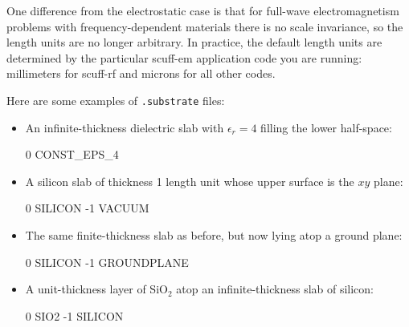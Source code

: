 \documentclass[letterpaper]{article}
\begin{document}
One difference from the electrostatic case is that for full-wave
electromagnetism problems with frequency-dependent materials
there is no scale invariance, so the length units are no longer
arbitrary. In practice, the default length units are determined
by the particular {\sc scuff-em} application code you are running:
millimeters for {\sc scuff-rf} and microns for all other codes.

Here are some examples of \texttt{.substrate} files:

\begin{itemize}

\item An infinite-thickness dielectric slab with $\epsilon_r=4$ filling
the lower half-space:

\medskip
\begin{verbcode}
0 CONST_EPS_4
\end{verbcode}
\medskip

\item A silicon slab of thickness 1 length unit whose upper surface is
the $xy$ plane:

\medskip
\begin{verbcode}
 0 SILICON
-1 VACUUM
\end{verbcode}

\item The same finite-thickness slab as before, but now 
lying atop a ground plane:

\medskip
\begin{verbcode}
 0 SILICON
-1 GROUNDPLANE
\end{verbcode}
\medskip

\item A unit-thickness layer of SiO$_2$ atop an infinite-thickness
slab of silicon:

\medskip
\begin{verbcode}
 0 SIO2
-1 SILICON
\end{verbcode}


\end{itemize}
\end{document}
